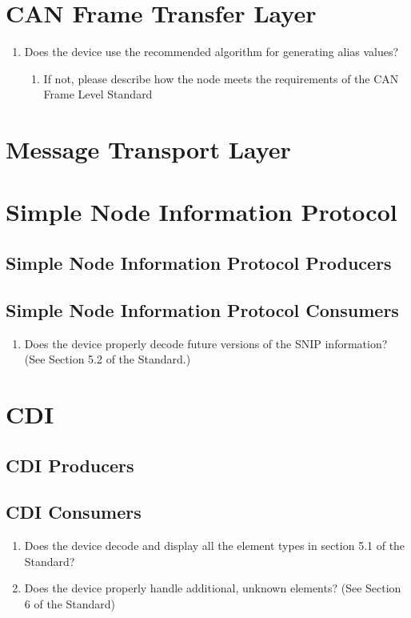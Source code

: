 \section{CAN Frame Transfer Layer}
\begin{enumerate}
    \item Does the device use the recommended algorithm for generating alias values?
    \begin{enumerate}
        \item If not, please describe how the node meets the requirements of the 
            CAN Frame Level Standard 
    \end{enumerate}
\end{enumerate}

\section{Message Transport Layer}

\section{Simple Node Information Protocol}
\subsection{Simple Node Information Protocol Producers}

\subsection{Simple Node Information Protocol Consumers}
\begin{enumerate}
    \item Does the device properly decode future versions of the SNIP
        information? (See Section 5.2 of the Standard.)
\end{enumerate}


\section{CDI}
\subsection{CDI Producers}

\subsection{CDI Consumers}
\begin{enumerate}
    \item Does the device decode and display all the element types in section 
            5.1 of the Standard?
    \item Does the device properly handle additional, unknown elements? 
            (See Section 6 of the Standard)
\end{enumerate}

  
